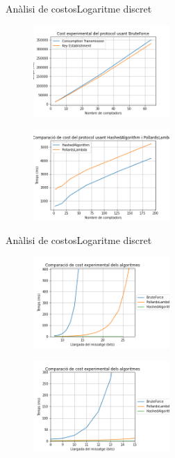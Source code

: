 \documentclass{beamer}
\begin{document}
\begin{frame}{Anàlisi de costos}{Logaritme discret}
	\begin{multicols}{2}
	\begin{figure}
		\includegraphics[width=14em]{images/brute.png}
	\end{figure}
	\newpage
	\begin{figure}
		\includegraphics[width=14em]{images/comp.png}
	\end{figure}
\end{multicols}
\end{frame}

\begin{frame}{Anàlisi de costos}{Logaritme discret}
	\begin{multicols}{2}
		\begin{figure}
			\includegraphics[width=14em]{images/algoritmes-cost.png}
		\end{figure}
		\newpage
		\begin{figure}
			\includegraphics[width=14em]{images/algoritmes-cost2.png}
		\end{figure}
	\end{multicols}
\end{frame}
\end{document}
